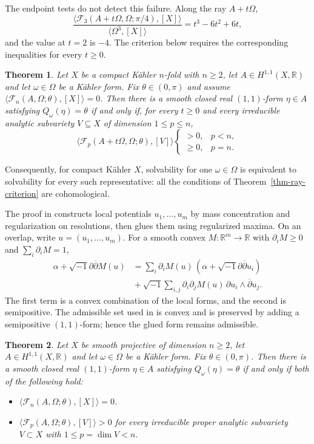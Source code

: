 \documentclass[12pt,reqno]{amsart}
\numberwithin{equation}{section}
\theoremstyle{plain}
\newcommand{\recallheading}{Theorem}
\newtheorem*{recalledtheorem}{\recallheading}
\newenvironment{theoremrecall}[1]{%
 \renewcommand{\recallheading}{Theorem~\ref{#1} (recalled)}%
 \begin{recalledtheorem}%
}{\end{recalledtheorem}}
\theoremstyle{definition}
\newcommand{\ddbar}{\sqrt{-1}\partial\overline{\partial}}
\newcommand{\cF}{\mathcal F}
\newcommand{\R}{\mathbb R}
\newcommand{\RayCriterionStatement}{%
Let $X$ be a compact K\"ahler $n$-fold with $n\geq2$, let
$A\in H^{1,1}(X,\R)$ and let $\omega\in\Omega$ be a K\"ahler form.
Fix $\theta\in(0,\pi)$ and assume
$\langle\cF_n(A,\Omega;\theta),[X]\rangle=0$.
Then there is a smooth closed real $(1,1)$-form $\eta\in A$ satisfying
$Q_\omega(\eta)=\theta$ if and only if, for every $t\geq0$ and every
irreducible analytic subvariety
$V\subseteq X$ of dimension $1\leq p\leq n$,
\[
 \big\langle\cF_p(A+t\Omega,\Omega;\theta),[V]\big\rangle
 \begin{cases}
 >0,&p<n,\\
 \geq0,&p=n.
 \end{cases}
\]
}
\newcommand{\ProjectiveCriterionStatement}{%
Let $X$ be smooth projective of dimension $n\geq2$, let
$A\in H^{1,1}(X,\R)$ and let $\omega\in\Omega$ be a K\"ahler form.
Fix $\theta\in(0,\pi)$.
Then there is a smooth closed real $(1,1)$-form $\eta\in A$ satisfying
$Q_\omega(\eta)=\theta$ if and only if both of the following hold:
\begin{itemize}
\item $\langle\cF_n(A,\Omega;\theta),[X]\rangle=0$.
\item $\langle\cF_p(A,\Omega;\theta),[V]\rangle>0$ for every irreducible
proper analytic subvariety $V\subset X$ with $1\leq p=\dim V<n$.
\end{itemize}
}
\begin{document}
The endpoint tests do not detect this failure. Along the ray
$A+t\Omega$,
\[
 \frac{\langle\cF_3(A+t\Omega,\Omega;\pi/4),[X]\rangle}
      {\langle\Omega^3,[X]\rangle}
 =t^3-6t^2+6t,
\]
and the value at $t=2$ is $-4$. The criterion below requires the
corresponding inequalities for every $t\geq0$.

\begin{theoremrecall}{thm-ray-criterion}
\RayCriterionStatement
\end{theoremrecall}

Consequently, for compact K\"ahler $X$, solvability for one
$\omega\in\Omega$ is equivalent to solvability for every such
representative: all the conditions of Theorem~\ref{thm-ray-criterion}
are cohomological.

The proof in \cite[Sections 3--7]{CLT24} constructs local potentials
$u_1,\ldots,u_m$ by mass concentration and regularization on resolutions,
then glues them using regularized maxima. On an overlap, write
$u=(u_1,\ldots,u_m)$. For a smooth convex $M\colon\R^m\to\R$ with
$\partial_iM\geq0$ and $\sum_i\partial_iM=1$,
\begin{align*}
 \alpha+\ddbar M(u)
 &=\sum_i\partial_iM(u)\,(\alpha+\ddbar u_i)\\
 &{}+\sqrt{-1}\sum_{i,j}\partial_i\partial_jM(u)\,
          \partial u_i\wedge\overline\partial u_j.
\end{align*}
The first term is a convex combination of the local forms, and the
second is semipositive. The admissible set used in
\cite[Sections 3--7]{CLT24} is convex and is preserved by adding a
semipositive $(1,1)$-form; hence the glued form remains admissible.

\begin{theoremrecall}{thm-projective-criterion}
\ProjectiveCriterionStatement
\end{theoremrecall}
\end{document}
